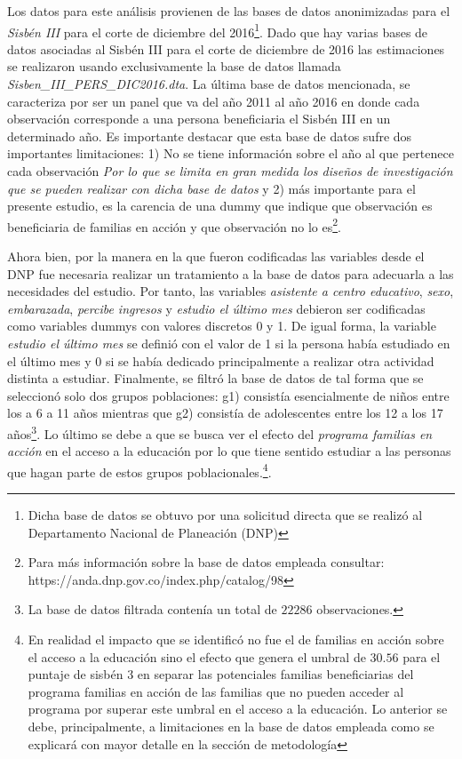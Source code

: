 \documentclass[AER]{AEA}
\begin{document}
Los datos para este análisis provienen de las bases de datos anonimizadas para el \textit{Sisbén III} para el corte de diciembre del 2016\footnote{Dicha base de datos se obtuvo por una solicitud directa que se realizó al Departamento Nacional de Planeación (DNP)}. Dado que hay varias bases de datos asociadas al Sisbén III para el corte de diciembre de 2016 las estimaciones se realizaron usando exclusivamente la base de datos llamada \textit{Sisben\_III\_PERS\_DIC2016.dta}. La última base de datos mencionada, se caracteriza por ser un panel que va del año 2011 al año 2016 en donde cada observación corresponde a una persona beneficiaria el Sisbén III en un determinado año. Es importante destacar que esta base de datos sufre dos importantes limitaciones: 1) No se tiene información sobre el año al que pertenece cada observación \textit{Por lo que se limita en gran medida los diseños de investigación que se pueden realizar con dicha base de datos} y 2) más importante para el presente estudio, es la carencia de una dummy que indique que observación es beneficiaria de familias en acción y que observación no lo es\footnote{Para más información sobre la base de datos empleada consultar: https://anda.dnp.gov.co/index.php/catalog/98}. 

Ahora bien, por la manera en la que fueron codificadas las variables desde el DNP fue necesaria realizar un tratamiento a la base de datos para adecuarla a las necesidades del estudio. Por tanto, las variables \textit{asistente a centro educativo}, \textit{sexo}, \textit{embarazada}, \textit{percibe ingresos} y \textit{estudio el último mes} debieron ser codificadas como variables dummys con valores discretos 0 y 1. De igual forma, la variable \textit{estudio el último mes} se definió con el valor de 1 si la persona había estudiado en el último mes y 0 si se había dedicado principalmente a realizar otra actividad distinta a estudiar. Finalmente, se filtró la base de datos de tal forma que se seleccionó solo dos grupos poblaciones: g1) consistía esencialmente de niños entre los a 6 a 11 años mientras que g2) consistía de adolescentes entre los 12 a los 17 años\footnote{La base de datos filtrada contenía un total de $22286$ observaciones.}. Lo último se debe a que se busca ver el efecto del \textit{programa familias en acción} en el acceso a la educación por lo que tiene sentido estudiar a las personas que hagan parte de estos grupos poblacionales.\footnote{En realidad el impacto que se identificó no fue el de familias en acción sobre el acceso a la educación sino el efecto que genera el umbral de $30.56$ para el puntaje de sisbén 3 en separar las potenciales familias beneficiarias del programa familias en acción de las familias que no pueden acceder al programa por superar este umbral en el acceso a la educación. Lo anterior se debe, principalmente, a limitaciones en la base de datos empleada como se explicará con mayor detalle en la sección de metodología}. 
\end{document}
